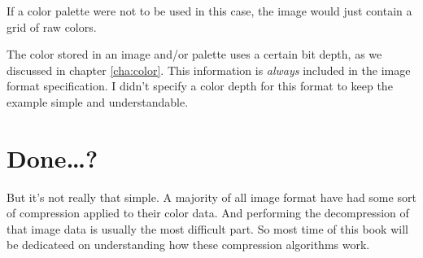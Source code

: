 If a color palette were not to be used in this case, the image would
just contain a grid of raw colors.

The color stored in an image and/or palette uses a certain bit depth,
as we discussed in chapter \ref{cha:color}. This information is
\textit{always} included in the image format specification. I didn't
specify a color depth for this format to keep the example simple and
understandable.

\section{Done\dots?}

But it's not really that simple. A majority of all image format have
had some sort of compression applied to their color data. And
performing the decompression of that image data is usually the
most difficult part. So most time of this book will be dedicateed on
understanding how these compression algorithms work.


